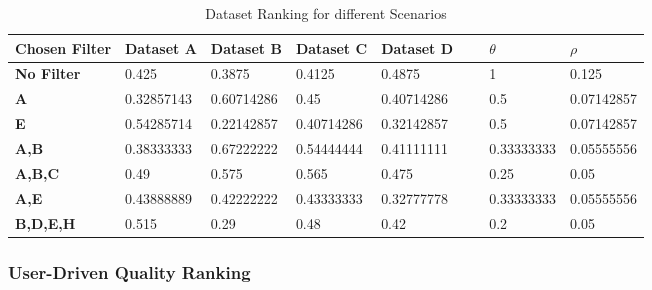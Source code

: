 \begin{table}[tbph]
    \begin{tabular}{|l|l|l|l|l|l|l|l|}
    \hline
    \textbf{Chosen Filter} & \textbf{Dataset A}                                 & \textbf{Dataset B}                                 & \textbf{Dataset C}  & \textbf{Dataset D}                                  & ~ & $\theta$ & $\rho$ \\  \hline
     \textbf{No Filter}     & 0.425                                     & 0.3875                                    & 0.4125     &      \cellcolor{blue!25} 0.4875 & ~ & 1                   & 0.125             \\  \hline
     \textbf{A}             & 0.32857143                                & \cellcolor{blue!25} 0.60714286 & 0.45       & 0.40714286                                 & ~ & 0.5                 & 0.07142857        \\  \hline
    \textbf{E}             & \cellcolor{blue!25} 0.54285714 & 0.22142857                                & 0.40714286 & 0.32142857                                 & ~ & 0.5                 & 0.07142857        \\  \hline
     \textbf{A,B}           & 0.38333333                                & \cellcolor{blue!25} 0.67222222 & 0.54444444 & 0.41111111                                 & ~ & 0.33333333          & 0.05555556        \\  \hline
    \textbf{A,B,C}         & 0.49                                      & \cellcolor{blue!25} 0.575      & 0.565      & 0.475                                      & ~ & 0.25                & 0.05              \\  \hline
    \textbf{A,E}           & \cellcolor{blue!25} 0.43888889 & 0.42222222                                & 0.43333333 & 0.32777778                                 & ~ & 0.33333333          & 0.05555556        \\  \hline
    \textbf{B,D,E,H}       & \cellcolor{blue!25} 0.515      & 0.29                                      & 0.48       & 0.42                                       & ~ & 0.2                 & 0.05              \\  \hline
    \end{tabular}
    \caption{Dataset Ranking for different Scenarios}
    \label{tbl:dataset_ranking}
\end{table}

\subsubsection{User-Driven Quality Ranking}